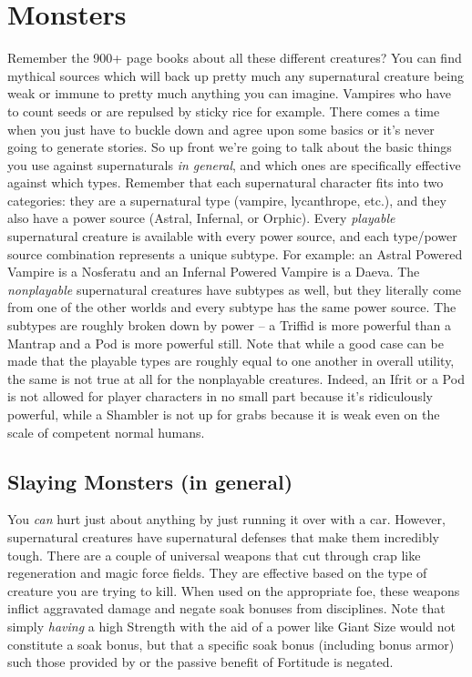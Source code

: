 \chapter{Monsters}

Remember the 900+ page books about all these different creatures? You can find mythical sources which will back up pretty much any supernatural creature being weak or immune to pretty much anything you can imagine. Vampires who have to count seeds or are repulsed by sticky rice for example. There comes a time when you just have to buckle down and agree upon some basics or it's never going to generate stories. So up front we're going to talk about the basic things you use against supernaturals \textit{in general}, and which ones are specifically effective against which types. Remember that each supernatural character fits into two categories: they are a supernatural type (vampire, lycanthrope, etc.), and they also have a power source (Astral, Infernal, or Orphic). Every \textit{playable} supernatural creature is available with every power source, and each type/power source combination represents a unique subtype. For example: an Astral Powered Vampire is a Nosferatu and an Infernal Powered Vampire is a Daeva. The \textit{nonplayable} supernatural creatures have subtypes as well, but they literally come from one of the other worlds and every subtype has the same power source. The subtypes are roughly broken down by power -- a Triffid is more powerful than a Mantrap and a Pod is more powerful still. Note that while a good case can be made that the playable types are roughly equal to one another in overall utility, the same is not true at all for the nonplayable creatures. Indeed, an Ifrit or a Pod is not allowed for player characters in no small part because it's ridiculously powerful, while a Shambler is not up for grabs because it is weak even on the scale of competent normal humans.

\section{Slaying Monsters (in general)}

\hspace{\parindent} You \textit{can} hurt just about anything by just running it over with a car. However, supernatural creatures have supernatural defenses that make them incredibly tough. There are a couple of universal weapons that cut through crap like regeneration and magic force fields. They are effective  based on the type of creature you are trying to kill. When used on the appropriate foe, these weapons inflict aggravated damage and negate soak bonuses from disciplines. Note that simply \textit{having} a high Strength with the aid of a power like Giant Size would not constitute a soak bonus, but that a specific soak bonus (including bonus armor) such those provided by  or the passive benefit of Fortitude is negated.

